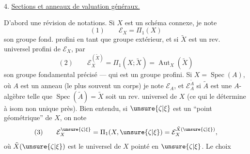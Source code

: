 4. \uline{Sections  et anneaux de valuation généraux.}

D'abord une révision de notations. Si $X$ est un schéma connexe, je note 
\[
(1)\qquad \mathcal E_X=\Pi_1(X)
\]
son groupe fond. profini en tant que groupe extérieur, et si $\tilde X$ est un rev. universel profini de $\mathcal E_X$, par
\[
(2)\qquad \mathcal E_X^{(\tilde X)}=\Pi_1(X;\tilde X)=\operatorname{Aut}_X(\tilde X)
\]
son groupe fondamental précisé --- qui est un groupe profini. Si $X=\operatorname{Spec}(A)$, où $A$ est un anneau (le plus souvent un corps) je note $\mathcal E_A$, et $\mathcal E_A^{\tilde A}$  si $\tilde A$ est une $A$-algèbre telle que $\operatorname{Spec}(\tilde A)=\tilde X$ soit un rev. universel de $X$ (ce qui le détermine à isom non unique près). Bien entendu, si $\unsure{\zeta|\xi}$ est un ``point géométrique'' de $X$, on note
\[
(3)\qquad \mathcal E_X^{\unsure{\zeta|\xi}}=\Pi_1(X,\unsure{\zeta|\xi})=\mathcal E_X^{\tilde X(\unsure{\zeta|\xi})},
\]
où $\tilde X(\unsure{\zeta|\xi})$ est le  universel de $X$ pointé en $\unsure{\zeta|\xi}$. Le choix
